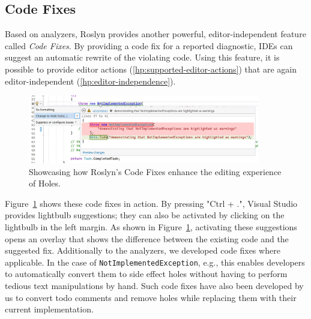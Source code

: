 \subsection{Code Fixes}
\label{sec:holey-code-fixes}
Based on analyzers, Roslyn provides another powerful, editor-independent feature called \emph{Code Fixes}.
By providing a code fix for a reported diagnostic, IDEs can suggest an automatic rewrite of the violating code.
Using this feature, it is possible to provide editor actions (\ref{hp:supported-editor-actions}) that are again editor-independent (\ref{hp:editor-independence}).

\begin{figure}[ht]
    \centering
    \includegraphics[width=0.9\textwidth]{images/code-fixes}
    \caption{Showcasing how Roslyn's Code Fixes enhance the editing experience of Holes.}
    \label{fig:holey-code-fixes}
\end{figure}

Figure~\ref{fig:holey-code-fixes} shows these code fixes in action.
By pressing "Ctrl + .", Visual Studio provides lightbulb suggestions; they can also be activated by clicking on the lightbulb in the left margin.
As shown in Figure~\ref{fig:holey-code-fixes}, activating these suggestions opens an overlay that shows the difference between the existing code and the suggested fix.
Additionally to the analyzers, we developed code fixes where applicable.
In the case of \verb|NotImplementedException|, e.g., this enables developers to automatically convert them to side effect holes without having to perform tedious text manipulations by hand.
Such code fixes have also been developed by us to convert todo comments and remove holes while replacing them with their current implementation.

